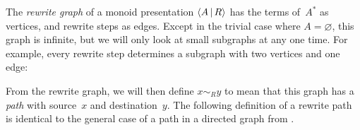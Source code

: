 \documentclass[../generics]{subfiles}
\begin{document}
\begin{definition}
The \emph{rewrite graph} of a monoid presentation $\langle A\,|\,R\rangle$ has the terms of~$A^*$ as vertices, and rewrite steps as edges. Except in the trivial case where $A=\varnothing$, this graph is infinite, but we will only look at small subgraphs at any one time. For example, every rewrite step determines a subgraph with two vertices and one edge:
\begin{center}
\end{center}
\end{definition}
From the rewrite graph, we will then define $x\sim_R y$ to mean that this graph has a \emph{path} with source~$x$ and destination~$y$. The following definition of a rewrite path is identical to the general case of a path in a directed graph from .
\end{document}
